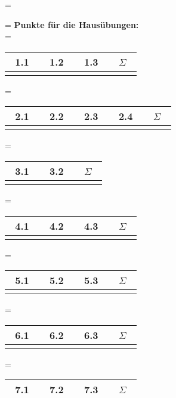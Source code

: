 \documentclass[twoside]{article}
\begin{document}
\ifnum\Title=\True
\thispagestyle{empty}
\-\vspace{0.5cm}
\begin{center}
	\fach
	\vspace{1.5cm}
	\gruppe
	\vspace{1.5cm}
	\memberOfGroup{\memOneName}{\memOneMail}{\memOneNr}
	\memberOfGroup{\memTwoName}{\memTwoMail}{\memTwoNr}
	\vspace{1cm}
	\datumf
	\vspace{1cm}
	
	\ifnum\Table=\True
	\textbf{Punkte für die Hausübungen:}\\
	\vspace{1cm}
	\ifnum\ZettelEins=\True
	\begin{tabular}{c|c|c|c}
	~1.1~&~1.2~&~1.3~&~$\Sigma$~	\\	\hline
		 &	   &	 &
	\end{tabular}
	\fi
	\ifnum\ZettelZwei=\True
	\begin{tabular}{c|c|c|c|c}
	~2.1~&~2.2~&~2.3~&~2.4~&~$\Sigma$~	\\	\hline
		 &	   &	 &		&
	\end{tabular}
	\fi
	\ifnum\ZettelDrei=\True
	\begin{tabular}{c|c|c}
	~3.1~&~3.2~&~$\Sigma$~	\\	\hline
		 &	   &
	\end{tabular}
	\fi
	\ifnum\ZettelVier=\True
	\begin{tabular}{c|c|c|c}
	~4.1~&~4.2~&~4.3~&~$\Sigma$~	\\	\hline
		 &	   &	 &
	\end{tabular}
	\fi
	\ifnum\ZettelFuenf=\True
	\begin{tabular}{c|c|c|c}
	~5.1~&~5.2~&~5.3~&~$\Sigma$~	\\	\hline
		 &	   &	 &
	\end{tabular}
	\fi
	\ifnum\ZettelSechs=\True
	\begin{tabular}{c|c|c|c}
	~6.1~&~6.2~&~6.3~&~$\Sigma$~	\\	\hline
		 &	   &	 &
	\end{tabular}
	\fi
	\ifnum\ZettelSieben=\True
	\begin{tabular}{c|c|c|c}
	~7.1~&~7.2~&~7.3~&~$\Sigma$~	\\	\hline

\end{tabular}
\end{center}
\end{document}
